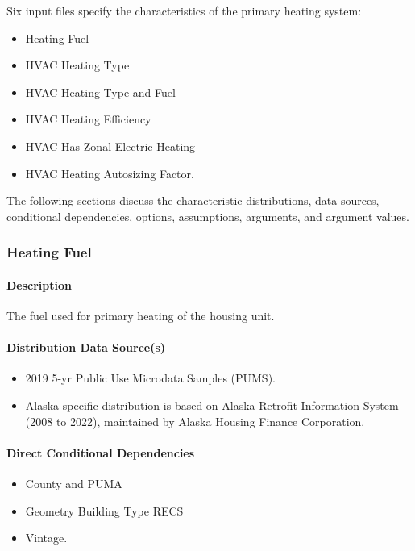 Six input files specify the characteristics of the primary heating system:
\begin{itemize}
    \item Heating Fuel
    \item HVAC Heating Type
    \item HVAC Heating Type and Fuel
    \item HVAC Heating Efficiency 
    \item HVAC Has Zonal Electric Heating
    \item HVAC Heating Autosizing Factor.
\end{itemize}

The following sections discuss the characteristic distributions, data sources, conditional dependencies, options, assumptions, arguments, and argument values.

\subsubsection{Heating Fuel}

\paragraph{Description}
The fuel used for primary heating of the housing unit.

\paragraph{Distribution Data Source(s)}
\begin{itemize}
    \item 2019 5-yr Public Use Microdata Samples (PUMS). 
    \item Alaska-specific distribution is based on Alaska Retrofit Information System (2008 to 2022), maintained by Alaska Housing Finance Corporation.
\end{itemize}

\paragraph{Direct Conditional Dependencies}
\begin{itemize}
    \item County and PUMA
    \item Geometry Building Type RECS
    \item Vintage.
\end{itemize}

